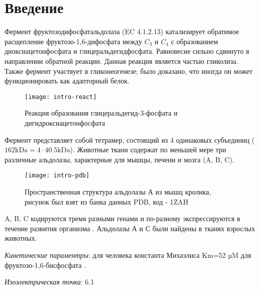 \section{Введение}
Фермент фруктозодифосфатальдолаза (EC 4.1.2.13) катализирует обратимое расщепление
фруктозо-1,6-дифосфата между $C_3$ и $C_4$ с образованием диоксиацетонфосфата и глицеральдегидфосфата.
Равновесие сильно сдвинуто в направлении обратной реакции.
Данная реакция является частью гликолиза. Также фермент участвует в гликонеогенезе;
было доказано, что иногда он может функционировать как адапторный белок.

\begin{figure}[htbp]
\texttt{[image: intro-react]}
\caption{Реакция образования глицеральдегид-3-фосфата и дигидроксиацетонфосфата}
\label{fig-intro-react}
\end{figure}

\label{lit-m}
Фермент представляет собой тетрамер, состоящий из 4 одинаковых субъединиц
($ 162 \text{kDa} = 4 \cdot 40.5 \text{kDa} $).
Животные ткани содержат по меньшей мере три различные альдолазы, характерные для
мышцы, печени и мозга (A, B, C).

\begin{figure}[htbp]
\texttt{[image: intro-pdb]}
\caption{Пространственная структура альдолазы А из мышц кролика,
    рисунок был взят из банка данных PDB, код - 1ZAH}
\label{fig-intro-pdb}
\end{figure}

A, B, C кодируются тремя разными генами и по-разному экспрессируются в течение развития организма
\cite{ABC} \cite{ABC-1}.
Альдолазы А и С были найдены в тканях взрослых животных.

\emph{Кинетические параментры}: для человека константа Михаэлиса Km=52 µM для фруктозо-1,6-бисфосфата
\cite{uniprot-human}.

\emph{Изоэлектрическая точка}: 6.1 \cite{pI}

